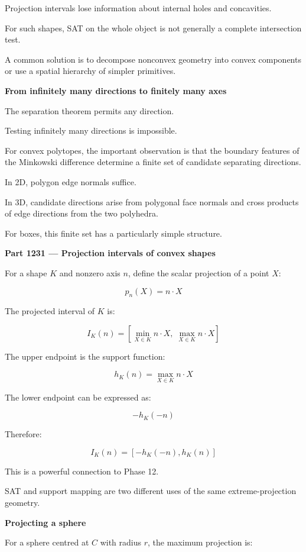 Projection intervals lose information about internal holes and concavities.

For such shapes, SAT on the whole object is not generally a complete intersection test.

A common solution is to decompose nonconvex geometry into convex components or use a spatial hierarchy of simpler primitives.

\textbf{From infinitely many directions to finitely many axes}

The separation theorem permits any direction.

Testing infinitely many directions is impossible.

For convex polytopes, the important observation is that the boundary features of the Minkowski difference determine a finite set of candidate separating directions.

In 2D, polygon edge normals suffice.

In 3D, candidate directions arise from polygonal face normals and cross products of edge directions from the two polyhedra.

For boxes, this finite set has a particularly simple structure.

\textbf{Part 1231 --- Projection intervals of convex shapes}

For a shape \(K\) and nonzero axis \(n\), define the scalar projection of a point \(X\):

\[
p_n(X)=n\cdot X
\]

The projected interval of \(K\) is:

\[
\boxed{ I_K(n)= \left[ \min_{X\in K}n\cdot X,\; \max_{X\in K}n\cdot X \right] }
\]

The upper endpoint is the support function:

\[
\boxed{ h_K(n)=\max_{X\in K}n\cdot X }
\]

The lower endpoint can be expressed as:

\[
\boxed{ -h_K(-n) }
\]

Therefore:

\[
\boxed{ I_K(n)=[-h_K(-n),h_K(n)] }
\]

This is a powerful connection to Phase 12.

SAT and support mapping are two different uses of the same extreme-projection geometry.

\textbf{Projecting a sphere}

For a sphere centred at \(C\) with radius \(r\), the maximum projection is:

